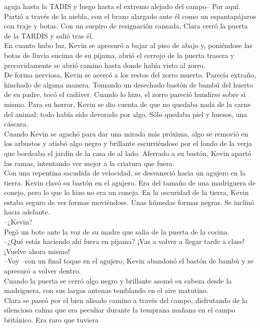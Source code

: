 {aguja hasta la TADIS y luego hasta el extremo alejado del campo-- Por
aquí.\\
Partió a través de la niebla, con el brazo alargado ante él como un
espantapájaros con traje y botas. Con un suspiro de resignación cansada,
Clara cerró la puerta de la TARDIS y salió tras él.\\[2\baselineskip]En
cuanto hubo luz, Kevin se apresuró a bajar al piso de abajo y,
poniéndose las botas de lluvia encima de su pijama, abrió el cerrojo de
la puerta trasera y precavidamente se abrió camino hasta donde había
visto al zorro.\\
De forma nerviosa, Kevin se acercó a los restos del zorro muerto.
Parecía extraño, hinchado de alguna manera. Tomando un desechado bastón
de bambú del huerto de su padre, tocó el cadáver. Cuando lo hizo, el
zorro pareció hundirse sobre sí mismo. Para su horror, Kevin se dio
cuenta de que no quedaba nada de la carne del animal; todo había sido
devorado por algo. Sólo quedaba piel y huesos, una cáscara.\\
Cuando Kevin se agachó para dar una mirada más próxima, algo se removió
en los arbustos y atisbó algo negro y brillante escurriéndose por el
fondo de la verja que bordeaba el jardín de la casa de al lado. Aferrado
a su bastón, Kevin apartó las ramas, intentando ver mejor a la criatura
que fuera.\\
Con una repentina sacudida de velocidad, se desvaneció hacia un agujero
en la tierra. Kevin clavó su bastón en el agujero. Era del tamaño de una
madriguera de conejo, pero lo que lo hizo no era un conejo. En la
oscuridad de la tierra, Kevin estaba seguro de ver formas moviéndose.
Unas húmedas formas negras. Se inclinó hacia adelante.\\
--¿Kevin?\\
Pegó un bote ante la voz de su madre que salía de la puerta de la
cocina.\\
--¿Qué estás haciendo ahí fuera en pijama? ¡Vas a volver a llegar tarde
a clase! ¡Vuelve ahora mismo!\\
--Voy --con un final toque en el agujero, Kevin abandonó el bastón de
bambú y se apresuró a volver dentro.\\
Cuando la puerta se cerró algo negro y brillante asomó su cabeza desde
la madriguera, con sus largas antenas temblando en el aire
matutino.\\[2\baselineskip]Clara se paseó por el bien alisado camino a
través del campo, disfrutando de la silenciosa calma que era peculiar
durante la temprana mañana en el campo británico. Era raro que tuviera
}
